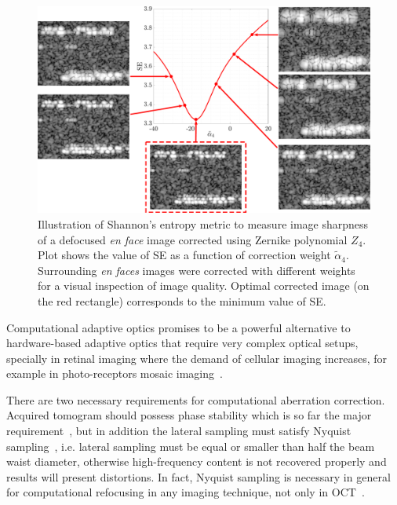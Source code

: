 \begin{figure}[htb!]
	\centering
	\includegraphics[width=\textwidth]{Figures/TheoreticalBasis/SharpnessCAO.pdf}
	\caption[Illustration of Shannon's entropy metric.]{Illustration of Shannon's entropy metric to measure image sharpness of a defocused \textit{en face} image corrected using Zernike polynomial $Z_4$. Plot shows the value of SE as a function of correction weight $\tilde{\alpha}_4$. Surrounding \textit{en faces} images were corrected with different weights for a visual inspection of image quality. Optimal corrected image (on the red rectangle) corresponds to the minimum value of SE.}
	\label{fig:Sharpness}
\end{figure}

Computational adaptive optics promises to be a powerful alternative to hardware-based adaptive optics that require very complex optical setups, specially in retinal imaging where the demand of cellular imaging increases, for example in photo-receptors mosaic imaging~\cite{Kumar2017_Invivo, Hillmann2016_Aberrationfree, South2018_Combined}.

There are two necessary requirements for computational aberration correction. Acquired tomogram should possess phase stability which is so far the major requirement~\cite{Shemonski2014_Stability, Liu2017_Computational, South2016_Computed}, but in addition the lateral sampling must satisfy Nyquist sampling~\cite{Liu2017_Computational}, i.e. lateral sampling must be equal or smaller than half the beam waist diameter, otherwise high-frequency content is not recovered properly and results will present distortions. In fact, Nyquist sampling is necessary in general for computational refocusing in any imaging technique, not only in OCT~\cite{Wallace2001_Workingpersons, Pawley2006_Handbook, Biggs2010_3D}. 


